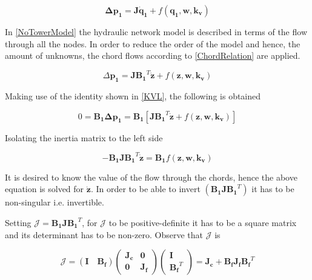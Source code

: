 \begin{equation}
  \pmb{\Delta p_1} =  \pmb{J} \pmb{\dot{q}_1} + f(\pmb{q_1}, \pmb{w}, \pmb{k_v})
  \label{NoTowerModel}
\end{equation}

In \eqref{NoTowerModel} the hydraulic network model is described in terms of the 
flow through all the nodes. In order to reduce the order of the model and hence, 
the amount of unknowns, the chord flows according to \eqref{ChordRelation} are applied. 

\begin{equation}
  \Delta \pmb{p_1} =  \pmb{J} {\pmb{B_1}}^T \pmb{\dot{z}} + f(\pmb{z}, \pmb{w}, \pmb{k_v})
  \label{ChordsModel}
\end{equation}

Making use of the identity shown in \eqref{KVL}, the following is obtained

\begin{equation}
  0 = \pmb{B_1} \pmb{\Delta p_1} = \pmb{B_1} [ \pmb{J {B_1}}^T \pmb{\dot{z}} + f(\pmb{z}, \pmb{w}, \pmb{k_v})] 
 \end{equation}

Isolating the inertia matrix to the left side

\begin{equation}
 - \pmb{B_1} \pmb{J} \pmb{{B_1}}^T \pmb{\dot{z}}  = \pmb{B_1} f(\pmb{z}, \pmb{w}, \pmb{k_v})
 \label{isolateZ}
 \end{equation}

It is desired to know the value of the flow through the chords, hence the above equation is solved 
for $\pmb{\dot{z}}$. In order to be able to invert $(\pmb{B_1 J} \pmb{{B_1}}^T)$ it has to be non-singular i.e. invertible. 

Setting $\pmb{\mathcal{J}} = \pmb{B_1 J} \pmb{{B_1}}^T $, for $\pmb{\mathcal{J}}$ to be positive-definite it has to be a square matrix and its 
determinant has to be non-zero. Observe that $\pmb{\mathcal{J}}$ is

\begin{equation}
  \label{Jequation}
  \pmb{\mathcal{J}} = (\pmb{I \quad B_f}) 
  \begin{pmatrix}
    \pmb{J_c}    &    \pmb{0 }   \\
    \pmb{0}       &   \pmb{ J_f}
  \end{pmatrix}
  \begin{pmatrix}
    \pmb{I}    \\
    \pmb{{B_f}}^T
  \end{pmatrix}
  = \pmb{J_c} + \pmb{B_f J_f} \pmb{{B_f}}^T
\end{equation}

